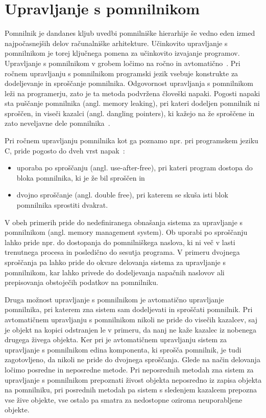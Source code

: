 \section{Upravljanje s pomnilnikom}

Pomnilnik je dandanes kljub uvedbi pomnilniške hierarhije še vedno eden izmed najpočasnejših delov računalniške arhitekture. Učinkovito upravljanje s pomnilnikom je torej ključnega pomena za učinkovito izvajanje programov. Upravljanje s pomnilnikom v grobem ločimo na ročno in avtomatično~\cite{jones2023garbage}. Pri ročnem upravljanju s pomnilnikom programski jezik vsebuje konstrukte za dodeljevanje in sproščanje pomnilnika. Odgovornost upravljanja s pomnilnikom leži na programerju, zato je ta metoda podvržena človeški napaki. Pogosti napaki sta puščanje pomnilnika (angl. memory leaking), pri kateri dodeljen pomnilnik ni sproščen, in viseči kazalci (angl. dangling pointers), ki kažejo na že sproščene in zato neveljavne dele pomnilnika~\cite{jones2023garbage}.

Pri ročnem upravljanju pomnilnika kot ga poznamo npr. pri programskem jeziku C, pride pogosto do dveh vrst napak~\cite{jones2023garbage}:

\begin{itemize}
	\itemsep 0em
	\item uporaba po sproščanju (angl. use-after-free), pri kateri program dostopa do bloka pomnilnika, ki je že bil sproščen in
	\item dvojno sproščanje (angl. double free), pri katerem se skuša isti blok pomnilnika sprostiti dvakrat.
\end{itemize}

V obeh primerih pride do nedefiniranega obnašanja sistema za upravljanje s pomnilnikom (angl. memory management system). Ob uporabi po sproščanju lahko pride npr. do dostopanja do pomnilniškega naslova, ki ni več v lasti trenutnega procesa in posledično do sesutja programa. V primeru dvojnega sproščanja pa lahko pride do okvare delovanja sistema za upravljanje s pomnilnikom, kar lahko privede do dodeljevanja napačnih naslovov ali prepisovanja obstoječih podatkov na pomnilniku.

Druga možnost upravljanje s pomnilnikom je avtomatično upravljanje pomnilnika, pri katerem zna sistem sam dodeljevati in sproščati pomnilnik. Pri avtomatičnem upravljanju s pomnilnikom nikoli ne pride do visečih kazalcev, saj je objekt na kopici odstranjen le v primeru, da nanj ne kaže kazalec iz nobenega drugega živega objekta. Ker pri je avtomatičnem upravljanju sistem za upravljanje s pomnilnikom edina komponenta, ki sprošča pomnilnik, je tudi zagotovljeno, da nikoli ne pride do dvojnega sproščanja. Glede na način delovanja ločimo posredne in neposredne metode. Pri neposrednih metodah zna sistem za upravljanje s pomnilnikom prepoznati živost objekta neposredno iz zapisa objekta na pomnilniku, pri posrednih metodah pa sistem s sledenjem kazalcem prepozna vse žive objekte, vse ostalo pa smatra za nedostopne oziroma neuporabljene objekte.

